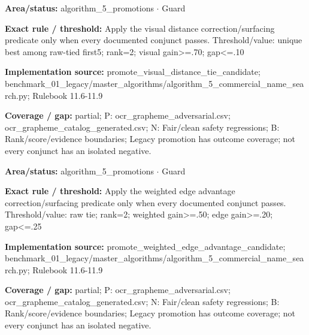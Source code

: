 \begin{tcolorbox}[enhanced,breakable,colback=white,colframe=Muted!45,boxrule=0.45pt,arc=1.5pt,left=6pt,right=6pt,top=5pt,bottom=5pt,title={\texttt{A5-PROMOTE-VISUAL-DISTANCE}},title after break={\texttt{A5-PROMOTE-VISUAL-DISTANCE}\ (continued)},fonttitle=\headingfont\bfseries\color{Navy},coltitle=Navy]
\textbf{Area/status:} algorithm\_\allowbreak{}5\_\allowbreak{}promotions $\boldsymbol{\cdot}$ Guard\par
\smallskip
\textbf{Exact rule / threshold:} Apply the visual distance correction/\allowbreak{}surfacing predicate only when every documented conjunct passes. Threshold/\allowbreak{}value: unique best among raw-tied first5; rank=2; visual gain>=.70; gap<=.10\par
\smallskip
\textbf{Implementation source:} promote\_\allowbreak{}visual\_\allowbreak{}distance\_\allowbreak{}tie\_\allowbreak{}candidate; benchmark\_\allowbreak{}01\_\allowbreak{}legacy/\allowbreak{}master\_\allowbreak{}algorithms/\allowbreak{}algorithm\_\allowbreak{}5\_\allowbreak{}commercial\_\allowbreak{}name\_\allowbreak{}search.py; Rulebook 11.6-11.9\par
\smallskip
\textbf{Coverage / gap:} partial; P: ocr\_\allowbreak{}grapheme\_\allowbreak{}adversarial.csv; ocr\_\allowbreak{}grapheme\_\allowbreak{}catalog\_\allowbreak{}generated.csv; N: Fair/\allowbreak{}clean safety regressions; B: Rank/\allowbreak{}score/\allowbreak{}evidence boundaries; Legacy promotion has outcome coverage; not every conjunct has an isolated negative.
\end{tcolorbox}
\begin{tcolorbox}[enhanced,breakable,colback=white,colframe=Muted!45,boxrule=0.45pt,arc=1.5pt,left=6pt,right=6pt,top=5pt,bottom=5pt,title={\texttt{A5-PROMOTE-WEIGHTED-EDGE-ADVANTAGE}},title after break={\texttt{A5-PROMOTE-WEIGHTED-EDGE-ADVANTAGE}\ (continued)},fonttitle=\headingfont\bfseries\color{Navy},coltitle=Navy]
\textbf{Area/status:} algorithm\_\allowbreak{}5\_\allowbreak{}promotions $\boldsymbol{\cdot}$ Guard\par
\smallskip
\textbf{Exact rule / threshold:} Apply the weighted edge advantage correction/\allowbreak{}surfacing predicate only when every documented conjunct passes. Threshold/\allowbreak{}value: raw tie; rank=2; weighted gain>=.50; edge gain>=.20; gap<=.25\par
\smallskip
\textbf{Implementation source:} promote\_\allowbreak{}weighted\_\allowbreak{}edge\_\allowbreak{}advantage\_\allowbreak{}candidate; benchmark\_\allowbreak{}01\_\allowbreak{}legacy/\allowbreak{}master\_\allowbreak{}algorithms/\allowbreak{}algorithm\_\allowbreak{}5\_\allowbreak{}commercial\_\allowbreak{}name\_\allowbreak{}search.py; Rulebook 11.6-11.9\par
\smallskip
\textbf{Coverage / gap:} partial; P: ocr\_\allowbreak{}grapheme\_\allowbreak{}adversarial.csv; ocr\_\allowbreak{}grapheme\_\allowbreak{}catalog\_\allowbreak{}generated.csv; N: Fair/\allowbreak{}clean safety regressions; B: Rank/\allowbreak{}score/\allowbreak{}evidence boundaries; Legacy promotion has outcome coverage; not every conjunct has an isolated negative.
\end{tcolorbox}
